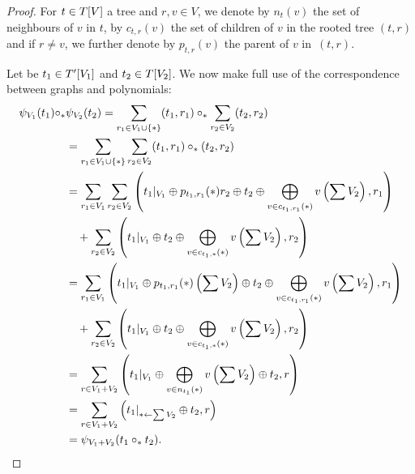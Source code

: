 \documentclass[11pt]{article}
\theoremstyle{definition}
\numberwithin{equation}{section}
\newcommand{\take}{\leftarrow}
\newcommand{\set}[1]{\left\{#1\right\}}
\newcommand{\spe}[1]{\normalfont{\textsc{#1}}}
\newcommand{\comp}[1][\ast]{\circ_{#1}}
\newcommand{\T}{\spe{T}}
\begin{document}
\begin{proof}
    For $t\in \T[V]$ a tree and $r,v\in V$, we denote by $n_t(v)$ the set of neighbours of $v$ in $t$, by 
    $c_{t,r}(v)$ the set of children of $v$ in the rooted tree $(t,r)$ and if $r\not = v$, we further denote 
    by $p_{t,r}(v)$ the parent of $v$ in~$(t,r)$.

    Let be $t_1\in \T'[V_1]$ and $t_2\in \T[V_2]$. We now make full use of the correspondence between 
    graphs and polynomials:
    \begin{align}
        \psi_{V_1}(t_1)\comp &\psi_{V_2}(t_2) 
        = \sum_{r_1\in V_1\cup\set{\ast}} (t_1,r_1) \comp \sum_{r_2\in V_2}(t_2,r_2) \\ \nonumber
        &= \sum_{r_1\in V_1\cup\set{\ast}}\sum_{r_2\in V_2} (t_1,r_1)\comp (t_2,r_2) \\ \nonumber 
        &= \sum_{r_1\in V_1}\sum_{r_2\in V_2} \left(t_1|_{V_1}\oplus p_{t_1,r_1}(\ast)r_2
        \oplus t_2 \oplus \bigoplus_{v\in c_{t_1,r_1}(\ast)} v\left(\sum V_2\right), r_1\right) \\ \nonumber
        &\quad + \sum_{r_2\in V_2}\left(t_1|_{V_1}\oplus t_2 \oplus \bigoplus_{v\in c_{t_1,\ast}(\ast)} v\left(\sum V_2\right),r_2\right) \\ \nonumber
        &= \sum_{r_1\in V_1} \left(t_1|_{V_1}\oplus p_{t_1,r_1}(\ast)\left(\sum V_2\right) \oplus t_2 \oplus \bigoplus_{v\in c_{t_1,r_1}(\ast)}v\left(\sum V_2\right), r_1\right) \\ \nonumber
        &\quad+ \sum_{r_2\in V_2} \left(t_1|_{V_1}\oplus t_2 \oplus \bigoplus_{v\in c_{t_1,\ast}(\ast)} v\left(\sum V_2\right),r_2\right) \\ \nonumber
        &= \sum_{r\in V_1+V_2}\left(t_1|_{V_1}\oplus\bigoplus_{v\in n_{t_1}(\ast)}v\left(\sum V_2\right)\oplus t_2,r\right) \\ \nonumber
        &= \sum_{r\in V_1+V_2} \left(t_1|_{\ast \take \sum V_2}\oplus t_2,r\right) \\ \nonumber
        &= \psi_{V_1+V_2}(t_1\comp t_2). \qedhere
    \end{align}
\end{proof}
\end{document}
